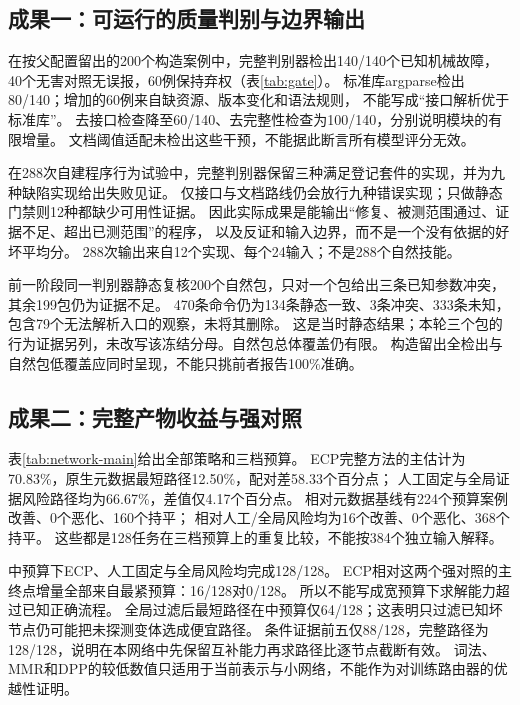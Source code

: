 \subsection{成果一：可运行的质量判别与边界输出}
\label{sec:gate-results}

在按父配置留出的200个构造案例中，完整判别器检出140/140个已知机械故障，
40个无害对照无误报，60例保持弃权（表\ref{tab:gate}）。
标准库argparse检出80/140；增加的60例来自缺资源、版本变化和语法规则，
不能写成“接口解析优于标准库”。
去接口检查降至60/140、去完整性检查为100/140，分别说明模块的有限增量。
文档阈值适配未检出这些干预，不能据此断言所有模型评分无效。

在288次自建程序行为试验中，完整判别器保留三种满足登记套件的实现，并为九种缺陷实现给出失败见证。
仅接口与文档路线仍会放行九种错误实现；只做静态门禁则12种都缺少可用性证据。
因此实际成果是能输出“修复、被测范围通过、证据不足、超出已测范围”的程序，
以及反证和输入边界，而不是一个没有依据的好坏平均分。
288次输出来自12个实现、每个24输入；不是288个自然技能。

前一阶段同一判别器静态复核200个自然包，只对一个包给出三条已知参数冲突，其余199包仍为证据不足。
470条命令仍为134条静态一致、3条冲突、333条未知，包含79个无法解析入口的观察，未将其删除。
这是当时静态结果；本轮三个包的行为证据另列，未改写该冻结分母。自然包总体覆盖仍有限。
构造留出全检出与自然包低覆盖应同时呈现，不能只挑前者报告100\%准确。

\subsection{成果二：完整产物收益与强对照}
\label{sec:network-results}

表\ref{tab:network-main}给出全部策略和三档预算。
ECP完整方法的主估计为70.83\%，原生元数据最短路径12.50\%，配对差58.33个百分点；
人工固定与全局证据风险路径均为66.67\%，差值仅4.17个百分点。
相对元数据基线有224个预算案例改善、0个恶化、160个持平；
相对人工/全局风险均为16个改善、0个恶化、368个持平。
这些都是128任务在三档预算上的重复比较，不能按384个独立输入解释。

中预算下ECP、人工固定与全局风险均完成128/128。
ECP相对这两个强对照的主终点增量全部来自最紧预算：16/128对0/128。
所以不能写成宽预算下求解能力超过已知正确流程。
全局过滤后最短路径在中预算仅64/128；这表明只过滤已知坏节点仍可能把未探测变体选成便宜路径。
条件证据前五仅88/128，完整路径为128/128，说明在本网络中先保留互补能力再求路径比逐节点截断有效。
词法、MMR和DPP的较低数值只适用于当前表示与小网络，不能作为对训练路由器的优越性证明。

